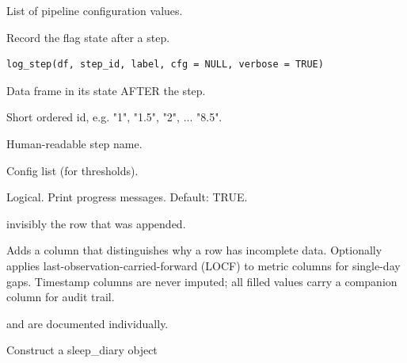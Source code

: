 \documentclass[a4paper]{book}
\begin{document}
%
\begin{Value}
List of pipeline configuration values.
\end{Value}
%
\begin{Description}
Record the flag state after a step.
\end{Description}
%
\begin{Usage}
\begin{verbatim}
log_step(df, step_id, label, cfg = NULL, verbose = TRUE)
\end{verbatim}
\end{Usage}
%
\begin{Arguments}
\begin{ldescription}
\item[\code{df}] Data frame in its state AFTER the step.

\item[\code{step\_id}] Short ordered id, e.g. "1", "1.5", "2", ... "8.5".

\item[\code{label}] Human-readable step name.

\item[\code{cfg}] Config list (for thresholds).

\item[\code{verbose}] Logical. Print progress messages. Default: TRUE.
\end{ldescription}
\end{Arguments}
%
\begin{Value}
invisibly the row that was appended.
\end{Value}
%
\begin{Description}
Adds a  column that distinguishes why a row has
incomplete data.  Optionally applies last-observation-carried-forward
(LOCF) to metric columns for single-day gaps.  Timestamp columns are
never imputed; all filled values carry a  companion
column for audit trail.
\end{Description}
%
\begin{Details}
 and  are
documented individually.
\end{Details}
%
\begin{Description}
Construct a sleep\_diary object
\end{Description}
\end{document}
